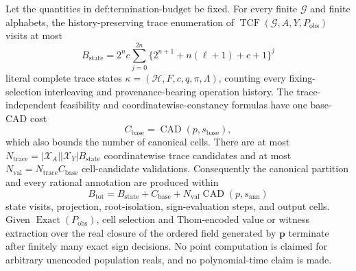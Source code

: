 Let the quantities in \(\text{def:termination-budget}\) be fixed. For every finite \(\mathcal G\) and finite alphabets, the history-preserving trace enumeration of \(\operatorname{TCF}(\mathcal G,A,Y,P_{\mathrm{obs}})\) visits at most
\[
B_{\mathrm{state}}=2^n c\sum_{j=0}^{2n}\bigl\{2^{n+1}+n(\ell+1)+c+1\bigr\}^j
\]
literal complete trace states \(\kappa=(\mathcal H,F,c,q,\pi,\Lambda)\), counting every fixing-selection interleaving and provenance-bearing operation history. The trace-independent feasibility and coordinatewise-constancy formulas have one base-CAD cost
\[
C_{\mathrm{base}}=\operatorname{CAD}(p,s_{\mathrm{base}}),
\]
which also bounds the number of canonical cells. There are at most \(N_{\mathrm{trace}}=|\mathcal X_A||\mathcal X_Y|B_{\mathrm{state}}\) coordinatewise trace candidates and at most \(N_{\mathrm{val}}=N_{\mathrm{trace}}C_{\mathrm{base}}\) cell-candidate validations. Consequently the canonical partition and every rational annotation are produced within
\[
B_{\mathrm{tot}}
=B_{\mathrm{state}}+C_{\mathrm{base}}
+N_{\mathrm{val}}\operatorname{CAD}(p,s_{\mathrm{ann}})
\]
state visits, projection, root-isolation, sign-evaluation steps, and output cells. Given \(\operatorname{Exact}(P_{\mathrm{obs}})\), cell selection and Thom-encoded value or witness extraction over the real closure of the ordered field generated by \(\mathbf p\) terminate after finitely many exact sign decisions. No point computation is claimed for arbitrary unencoded population reals, and no polynomial-time claim is made.